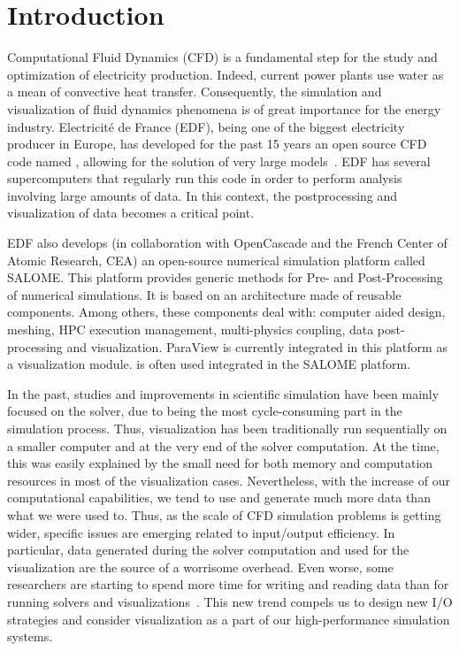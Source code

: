 \section{Introduction}
Computational Fluid Dynamics (CFD) is a fundamental step for the study and
optimization of electricity production. Indeed, current power plants use water
as a mean of convective heat transfer.  Consequently, the simulation and
visualization of fluid dynamics phenomena is of great importance for the energy
industry. Electricité de France (EDF), being one of the biggest electricity producer in Europe, has
developed for the past 15 years an open source CFD code named \CS,
allowing for the solution of very large models~\cite{5644955}. EDF has
several supercomputers that regularly run this code in order to perform
analysis involving large amounts of data. In this context, the postprocessing
and visualization of data becomes a critical point. 

EDF also develops (in collaboration with OpenCascade and the French Center of
Atomic Research, CEA) an open-source numerical simulation platform called
SALOME. This platform provides generic methods for Pre- and Post-Processing of
numerical simulations. It is based on an architecture made of reusable
components. Among others, these components deal with: computer aided design,
meshing, HPC execution management, multi-physics coupling, data post-processing
and visualization. ParaView is currently integrated in this platform as a
visualization module. \CS is often used integrated in the SALOME platform.

In the past, studies and improvements in scientific simulation have been mainly
focused on the solver, due to being the most cycle-consuming part in the
simulation process. Thus, visualization has been traditionally run sequentially
on a smaller computer and at the very end of the solver computation. At the
time, this was easily explained by the small need for both memory and
computation resources in most of the visualization cases. Nevertheless, with the
increase of our computational capabilities, we tend to use and generate much
more data than what we were used to. Thus, as the scale of CFD simulation
problems is getting wider, specific issues are emerging related to input/output
efficiency. In particular, data generated during the solver computation and
used for the visualization are the source of a worrisome overhead. Even worse,
some researchers are starting to spend more time for writing and reading data
than for running solvers and visualizations~\cite{1742-6596-125-1-012099}.
This new trend compels us to design new I/O strategies and consider
visualization as a part of our high-performance simulation systems.

